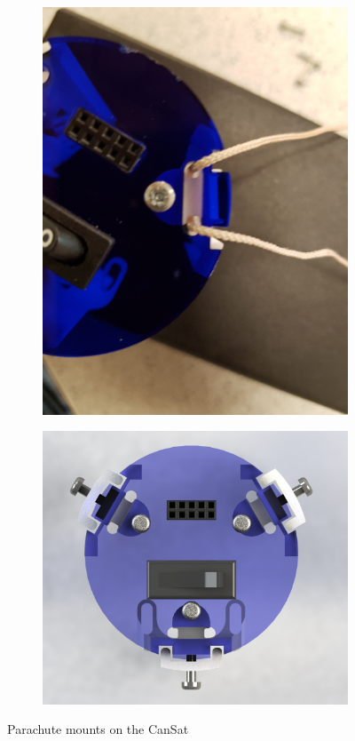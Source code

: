 \documentclass[]{report}
\begin{document}
\begin{figure}
	\centering
	\begin{subfigure}{.5\textwidth}
		\centering
		\includegraphics[width=.9\linewidth]{pmount.jpg}
	\end{subfigure}%
	\begin{subfigure}{.5\textwidth}
		\centering
		\includegraphics[width=0.8\linewidth, angle=0]{Parachute_mounts.jpg}
	\end{subfigure}
	\caption{Parachute mounts on the CanSat}
	\label{pmounts}
\end{figure}
\end{document}
